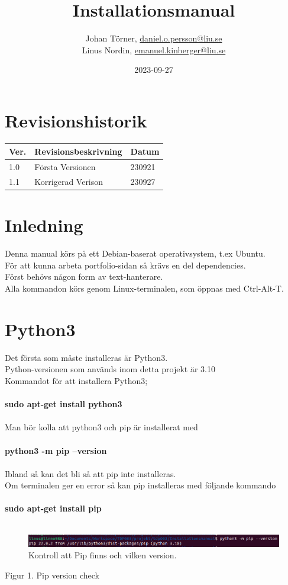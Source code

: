 \documentclass{TDP003mall}
\author{Johan Törner, \url{daniel.o.persson@liu.se}\\
  Linus Nordin, \url{emanuel.kinberger@liu.se}\\}
\title{Installationsmanual}
\date{2023-09-27}
\begin{document}
\graphicspath{ {./images/} }

\projectpage
\section{Revisionshistorik}
\begin{table}[!h]
\begin{tabularx}{\linewidth}{|l|X|l|}
\hline
Ver. & Revisionsbeskrivning & Datum \\\hline
1.0 & Första Versionen & 230921 \\\hline
1.1 & Korrigerad Verison & 230927 \\\hline
\end{tabularx}
\end{table}


\section{Inledning}

Denna manual körs på ett Debian-baserat operativsystem, t.ex Ubuntu.\\
För att kunna arbeta portfolio-sidan så krävs en del dependencies.\\
Först behövs någon form av text-hanterare.\\

Alla kommandon körs genom Linux-terminalen, som öppnas med Ctrl-Alt-T.\\



\section{Python3}
Det första som måste installeras är Python3.\\
Python-versionen som används inom detta projekt är 3.10\\ 
Kommandot för att installera Python3;\\\\
\textbf{sudo apt-get install python3}\\\\
Man bör kolla att python3 och pip är installerat med\\\\
\textbf{python3 -m pip --version}\\\\
Ibland så kan det bli så att pip inte installeras.\\
Om terminalen ger en error så kan pip installeras med följande kommando\\\\
\textbf{sudo apt-get install pip}\\\\
\begin{figure}[h]
  \centering
  \includegraphics[scale=0.5]{pip_version}
  \caption{\label{fig:The-caption} Kontroll att Pip finns och vilken version.}
\end{figure}
\caption*{Figur 1. Pip version check}
\end{document}
